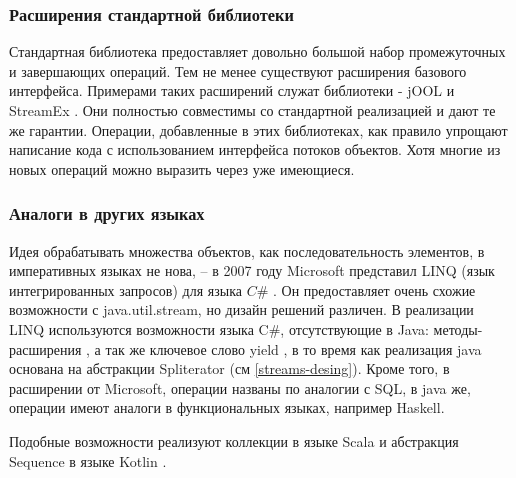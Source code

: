 \subsubsection{Расширения стандартной библиотеки}
Стандартная библиотека предоставляет довольно большой набор промежуточных и завершающих операций. Тем не менее существуют расширения базового интерфейса. Примерами таких расширений служат библиотеки - jOOL \cite{java:jool} и StreamEx \cite{java:streamex}. Они полностью совместимы со стандартной реализацией и дают те же гарантии. Операции, добавленные в этих библиотеках, как правило упрощают написание кода с использованием интерфейса потоков объектов. Хотя многие из новых операций можно выразить через уже имеющиеся.

\subsubsection{Аналоги в других языках}
Идея обрабатывать множества объектов, как последовательность элементов, в императивных языках не нова, -- в 2007 году Microsoft представил LINQ (язык интегрированных запросов) для языка $C\#$ \cite{ms:linq}. Он предоставляет очень схожие возможности с java.util.stream, но дизайн решений различен. В реализации LINQ используются возможности языка C\#, отсутствующие в Java: методы-расширения \cite{ms:ext}, а так же ключевое слово yield \cite{ms:yield}, в то время как реализация java основана на абстракции Spliterator (см \ref{streams-desing}). Кроме того, в расширении от Microsoft, операции названы по аналогии с SQL, в java же, операции имеют аналоги в функциональных языках, например Haskell.

Подобные возможности реализуют коллекции в языке Scala \cite{ho:scala} и абстракция Sequence в языке Kotlin \cite{ho:kotlin}.